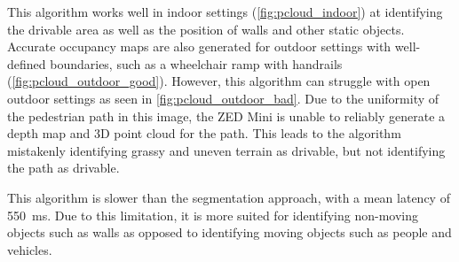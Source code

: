 This algorithm works well in indoor settings (\cref{fig:pcloud_indoor}) at identifying the drivable area
as well as the position of walls and other static objects. Accurate occupancy maps are also generated for
outdoor settings with well-defined boundaries, such as a wheelchair ramp with handrails (\cref{fig:pcloud_outdoor_good}).
However, this algorithm can struggle with open outdoor settings as seen in \cref{fig:pcloud_outdoor_bad}.
Due to the uniformity of the pedestrian path in this image, the ZED Mini is unable to
reliably generate a depth map and 3D point cloud for the path. This leads to the algorithm
mistakenly identifying grassy and uneven terrain as drivable, but not identifying the
path as drivable.

This algorithm is slower than the segmentation approach, with a mean latency of \SI{550}{\milli\second}.
Due to this limitation, it is more suited for identifying non-moving objects such as walls
as opposed to identifying moving objects such as people and vehicles.


